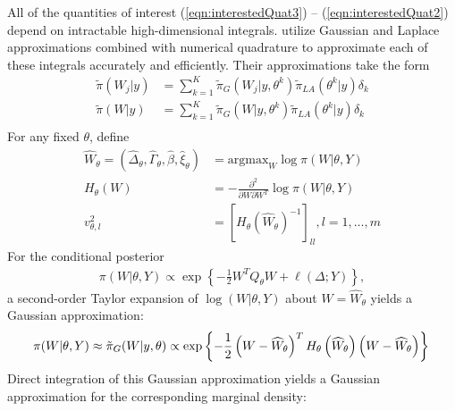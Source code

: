 \documentclass[]{article}
\begin{document}
All of the quantities of interest (\ref{eqn:interestedQuat3}) -- (\ref{eqn:interestedQuat2}) depend on intractable high-dimensional integrals. \citet{casecross} utilize Gaussian and Laplace approximations combined with numerical quadrature to approximate each of these integrals accurately and efficiently. Their approximations take the form
\begin{equation}\begin{aligned}\label{eqn:integration}
\tilde{\pi}(W_{j}|y) &= \sum_{k=1}^{K}
\tilde{\pi}_{G}(W_{j}|y,\theta^{k})
\tilde{\pi}_{LA}(\theta^{k}|y)\delta_{k} \\
\tilde{\pi}(W|y) &= \sum_{k=1}^{K}
\tilde{\pi}_{G}(W|y,\theta^{k})
\tilde{\pi}_{LA}(\theta^{k}|y)\delta_{k} \\
\end{aligned}\end{equation}
For any fixed $\theta$, define
\begin{equation}\begin{aligned}\label{eqn:modeandhessian}
\widehat{W}_{\theta} = \left( \widehat{\Delta}_{\theta},\widehat{\Gamma}_{\theta},\widehat{\beta},\widehat{\xi}_{\theta}\right) &= \text{argmax}_{W}\log\pi(W|\theta,Y) \\ 
H_{\theta}(W) &= -\frac{\partial^{2}}{\partial W \partial W^{T}}\log\pi(W|\theta,Y) \\
v_{\theta,l}^{2} &= \left[H_\theta \left(\widehat{W}_{\theta}\right) ^ {-1} \right]_{ll}, l = 1,\ldots,m
\end{aligned}\end{equation}
For the conditional posterior
\begin{equation}\begin{aligned}\label{eqn:condpost}
\pi(W|\theta,Y) \propto \exp\left\lbrace -\frac{1}{2}W^{T}Q_{\theta}W + \ell\left(\Delta;Y\right)\right\rbrace,
\end{aligned}\end{equation}
a second-order Taylor expansion of $\log(W|\theta,Y)$ about $W = \widehat{W}_{\theta}$ yields a Gaussian approximation:
\begin{equation}\label{eqn:gaussianapprox}
\pi(W|\theta,Y) \approx \tilde{\pi}_{G}(W|y,\theta) \propto \text{exp}\left\{-\frac{1}{2} \left(W-\widehat{W}_{\theta} \right)^T H_\theta\left(\widehat{W}_{\theta}\right) \left(W-\widehat{W}_{\theta} \right) \right\} \\
\end{equation}
Direct integration of this Gaussian approximation yields a Gaussian approximation for the corresponding marginal density:
\end{document}
